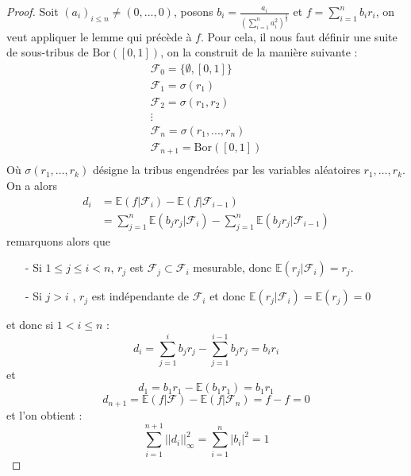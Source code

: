 \documentclass[12pt]{article}
\theoremstyle{definition}
\begin{document}
\begin{proof}
	Soit $(a_i)_{i\leq n}\neq(0,...,0)$, posons $b_i=\frac{a_i}{(\sum_{i=1}^{n}a_i^2)^{\frac{1}{2}}}$ et $f=\sum_{i=1}^{n}b_i r_i$, on veut appliquer le lemme qui précède à $f$. Pour cela, il nous faut définir une suite de sous-tribus de $\text{Bor}([0,1])$, on la construit de la manière suivante :
	\begin{equation*}
		\begin{array}{lll}
		\mathcal{F}_0=\big\{\emptyset,[0,1]\big\}\\
		\mathcal{F}_1=\sigma(r_1)\\
		\mathcal{F}_2=\sigma(r_1,r_2)\\
		\vdots\\
		\mathcal{F}_n=\sigma(r_1,...,r_n)\\
		\mathcal{F}_{n+1}=\text{Bor}([0,1])\\
		\end{array}
	\end{equation*}
	Où $\sigma(r_1,\dots,r_k)$ désigne la tribus engendrées par les variables aléatoires $r_1,\dots,r_k$. On a alors 
	\begin{align*}
		d_i &= \mathbb{E}(f|\mathcal{F}_i)-\mathbb{E}(f|\mathcal{F}_{i-1})\\
		&= \sum_{j=1}^{n}\mathbb{E}(b_jr_j|\mathcal{F}_i)-\sum_{j=1}^{n}\mathbb{E}(b_jr_j|\mathcal{F}_{i-1})
	\end{align*}
	remarquons alors que
	 \begin{enumerate}
		\item[-] Si $1 \leq j\leq i<n$, $r_j$ est $\mathcal{F}_j\subset\mathcal{F}_i$ mesurable, donc $\mathbb{E}(r_j|\mathcal{F}_i)=r_j$.
		\item[-] Si $j> i$ , $r_j$ est indépendante de $\mathcal{F}_i$ et donc $\mathbb{E}(r_j|\mathcal{F}_i)=\mathbb{E}(r_j)=0$
	\end{enumerate}
	et donc si $1< i\leq n$ :
	\begin{equation*}
		d_i =\sum_{j=1}^{i}b_jr_j-\sum_{j=1}^{i-1}b_jr_j= b_ir_i
	\end{equation*}
	et 
	\begin{equation*}
		d_1 = b_1r_1 - \mathbb{E}(b_1r_1)=b_1r_1
	\end{equation*}
	\begin{equation*}
		d_{n+1} = \mathbb{E}(f|\mathcal{F})-\mathbb{E}(f|\mathcal{F}_n)= f-f=0
	\end{equation*}
	et l'on obtient :
	\begin{equation*}
	\sum_{i=1}^{n+1}||d_i||^2_\infty = \sum_{i=1}^{n}|b_i|^2=1

\end{equation*}
\end{proof}
\end{document}
